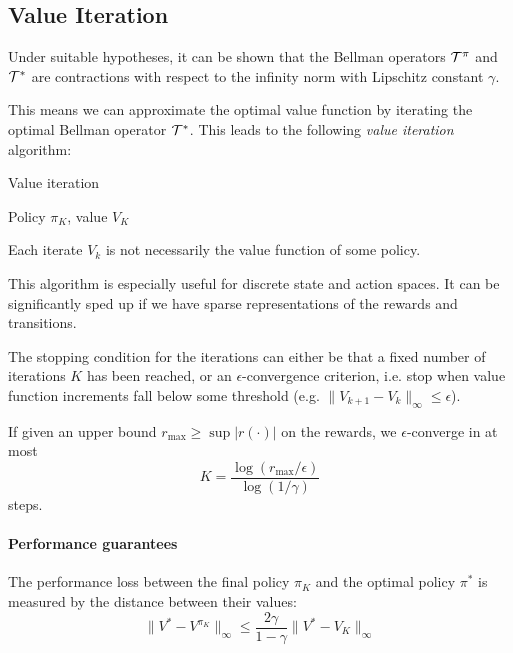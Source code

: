 \documentclass[../course-notes.tex]{subfiles}
\begin{document}
\subsection{Value Iteration}

Under suitable hypotheses, it can be shown that the Bellman operators $\mathcal{T}^\pi$ and $\mathcal{T}^*$ are contractions with respect to the infinity norm with Lipschitz constant $\gamma$.

This means we can approximate the optimal value function by iterating the optimal Bellman operator $\mathcal{T}^*$. This leads to the following \textit{value iteration} algorithm:

\begin{algorithm}
	\caption{Value iteration}
	\Return Policy $\pi_K$, value $V_K$\;
\end{algorithm}

\begin{remark}
Each iterate $V_k$ is not necessarily the value function of some policy.
\end{remark}

This algorithm is especially useful for discrete state and action spaces. It can be significantly sped up if we have sparse representations of the rewards and transitions.

The stopping condition for the iterations can either be that a fixed number of iterations $K$ has been reached, or an $\epsilon$-convergence criterion, i.e. stop when value function increments fall below some threshold (e.g. $\|V_{k+1} - V_k\|_{\infty} \leq \epsilon$).

\begin{prop}
	If given an upper bound $r_{\max{}} \geq \sup |r(\cdot)|$ on the rewards, we $\epsilon$-converge in at most
	\[
		K = \frac{\log(r_{\max{}}/\epsilon)}{\log(1/\gamma)}
	\]
	steps.
\end{prop}

\paragraph{Performance guarantees} The performance loss between the final policy $\pi_K$ and the optimal policy $\pi^*$ is measured by the distance between their values:
\[
	\|V^* - V^{\pi_K}\|_\infty \leq
	\frac{2\gamma}{1 - \gamma} \| V^* - V_K\|_\infty
\]
\end{document}
